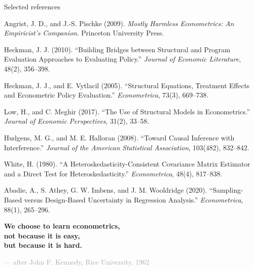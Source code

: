 \documentclass[aspectratio=169,11pt]{beamer}
\begin{document}
\begin{frame}{Selected references}

\scriptsize

Angrist, J. D., and J.-S. Pischke (2009).
\textit{Mostly Harmless Econometrics: An Empiricist's Companion}.
Princeton University Press.

\vspace{0.25em}

Heckman, J. J. (2010).
``Building Bridges between Structural and Program Evaluation
Approaches to Evaluating Policy.''
\textit{Journal of Economic Literature}, 48(2), 356--398.

\vspace{0.25em}

Heckman, J. J., and E. Vytlacil (2005).
``Structural Equations, Treatment Effects and Econometric Policy
Evaluation.''
\textit{Econometrica}, 73(3), 669--738.

\vspace{0.25em}

Low, H., and C. Meghir (2017).
``The Use of Structural Models in Econometrics.''
\textit{Journal of Economic Perspectives}, 31(2), 33--58.

\vspace{0.25em}

Hudgens, M. G., and M. E. Halloran (2008).
``Toward Causal Inference with Interference.''
\textit{Journal of the American Statistical Association},
103(482), 832--842.

\vspace{0.25em}

White, H. (1980).
``A Heteroskedasticity-Consistent Covariance Matrix Estimator and a Direct
Test for Heteroskedasticity.''
\textit{Econometrica}, 48(4), 817--838.

\vspace{0.25em}

Abadie, A., S. Athey, G. W. Imbens, and J. M. Wooldridge (2020).
``Sampling-Based versus Design-Based Uncertainty in Regression Analysis.''
\textit{Econometrica}, 88(1), 265--296.

\end{frame}

\begin{frame}

\begin{center}

\vspace{1em}

\LARGE
\textbf{
We choose to learn econometrics,
\\[0.5em]
not because it is easy,
\\[0.3em]
but because it is hard. 
}

\vspace{1.5em}

\normalsize
\textcolor{DarkGray}{--- after John F. Kennedy, Rice University, 1962}

\end{center}

\end{frame}
\end{document}

